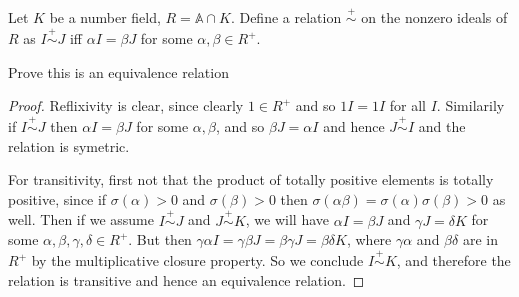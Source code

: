 \documentclass[11pt]{article}
\begin{document}
Let $K$ be a number field, $R = \mathbb{A} \cap K$.
Define a relation $\overset{+}{\sim}$ on the nonzero ideals of $R$ as $I \overset{+}{\sim} J$ iff $\alpha I = \beta J$ for some $\alpha, \beta \in R^+$.

Prove this is an equivalence relation
\begin{proof}
  Reflixivity is clear, since clearly $1 \in R^+$ and so $1I = 1I$ for all $I$.
  Similarily if $I \overset{+}{\sim} J$ then $\alpha I = \beta J$ for some $\alpha, \beta$, and so $\beta J = \alpha I$ and hence $J \overset{+}{\sim} I$ and the relation is symetric.

  For transitivity, first not that the product of totally positive elements is totally positive, since if $\sigma(\alpha) > 0$ and $\sigma(\beta) > 0$ then $\sigma(\alpha\beta) = \sigma(\alpha)\sigma(\beta) > 0$ as well.
  Then if we assume $I \overset{+}{\sim} J$ and $J \overset{+}{\sim} K$, we will have $\alpha I = \beta J$ and $\gamma J = \delta K$ for some $\alpha,\beta,\gamma,\delta \in R^+$.
  But then $\gamma \alpha I = \gamma \beta J = \beta \gamma J = \beta \delta K$, where $\gamma \alpha$ and $\beta \delta$ are in $R^+$ by the multiplicative closure property.
  So we conclude $I \overset{+}{\sim} K$, and therefore the relation is transitive and hence an equivalence relation.
\end{proof}
\end{document}
